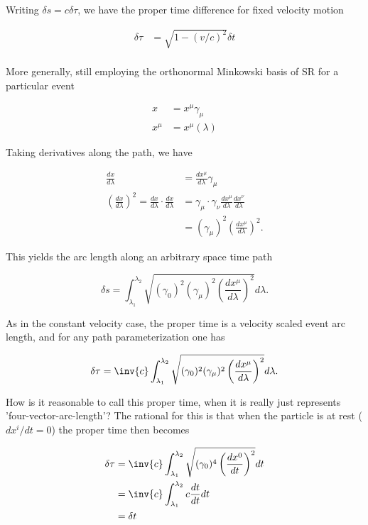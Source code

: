 \documentclass{article}      %
\begin{document}
Writing $\delta s = c \delta\tau$, we have the proper time difference for fixed velocity motion

\begin{align*}
\delta \tau &= \sqrt{ 1 - (v/c)^2 } \delta t \\
\end{align*}

More generally, still employing the orthonormal Minkowski basis of SR for a particular event

\begin{align*}
x &= x^{\mu} \gamma_{\mu} \\
x^{\mu} &= x^{\mu}(\lambda)
\end{align*}

Taking derivatives along the path, we have

\begin{align*}
\frac{dx}{d\lambda} &= \frac{dx^{\mu}}{d\lambda} \gamma_{\mu} \\
\left(\frac{dx}{d\lambda}\right)^2 = \frac{dx}{d\lambda} \cdot \frac{dx}{d\lambda}
&= \gamma_{\mu} \cdot \gamma_{\nu} \frac{dx^{\mu}}{d\lambda} \frac{dx^{\nu}}{d\lambda} \\
&= (\gamma_{\mu})^2 \left( \frac{dx^{\mu}}{d\lambda} \right)^2.
\end{align*}

This yields the arc length along an arbitrary space time path

\begin{equation*}
\delta s = \int_{\lambda_1}^{\lambda_2} \sqrt{ (\gamma_{0})^2 (\gamma_{\mu})^2 \left( \frac{dx^{\mu}}{d\lambda} \right)^2} d\lambda.
\end{equation*}

As in the constant velocity case, the proper time is a velocity scaled event arc length, and for any path parameterization one has

\begin{equation}
\delta \tau = \inv{c} \int_{\lambda_1}^{\lambda_2} \sqrt{ (\gamma_{0})^2 (\gamma_{\mu})^2 \left( \frac{dx^{\mu}}{d\lambda} \right)^2} d\lambda.
\end{equation}

How is it reasonable to call this proper time, when it is really just represents 'four-vector-arc-length'?  The rational for this is that when the particle is at rest ($dx^i/dt = 0$) the proper time then becomes

\begin{align*}
\delta \tau 
&= \inv{c} \int_{\lambda_1}^{\lambda_2} \sqrt{ (\gamma_{0})^4 \left(\frac{dx^0}{dt}\right)^2} dt \\
&= \inv{c} \int_{\lambda_1}^{\lambda_2} c \frac{dt}{dt} dt \\
&= \delta t
\end{align*}
\end{document}
